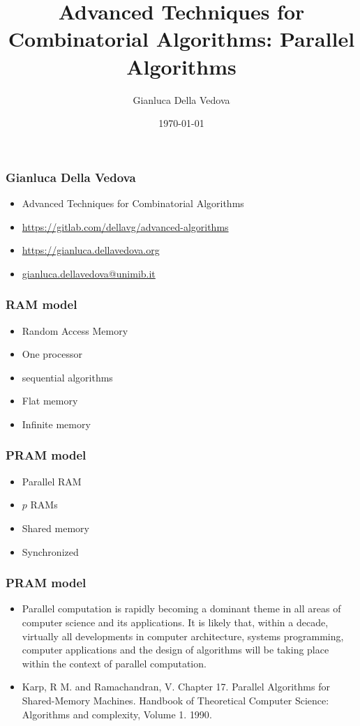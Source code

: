 \documentclass[14pt,aspectratio=169]{beamer}
\author{Gianluca Della Vedova}
\title[Advanced Algorithms]{Advanced Techniques for Combinatorial Algorithms:
Parallel Algorithms}
\institute[]{Univ. Milano--Bicocca\\
  \texttt{https://gianluca.dellavedova.org}}
\date[]{{\tiny \today\hspace{1em} \vcsShortHash}}
\begin{document}
\begin{frame}
  \titlepage
\end{frame}


\begin{frame}\frametitle{Gianluca Della Vedova}
  \begin{itemize}
  \item
                Advanced Techniques for Combinatorial Algorithms
\item
{\small\url{https://gitlab.com/dellavg/advanced-algorithms}}
  \item
{\small\url{https://gianluca.dellavedova.org}}
  \item
{\small\url{gianluca.dellavedova@unimib.it}}
  \end{itemize}
\end{frame}



\begin{frame}\frametitle{RAM model}
  \begin{itemize}
  \item
    Random Access Memory
  \item
    One processor
  \item
    sequential algorithms
  \item
    Flat memory
  \item
    Infinite memory
  \end{itemize}
\end{frame}

\begin{frame}\frametitle{PRAM model}
  \begin{itemize}
  \item
    \alert{Parallel} RAM
  \item
    $p$ RAMs
  \item
    Shared memory
  \item
    Synchronized
  \end{itemize}
\end{frame}

\begin{frame}\frametitle{PRAM model}
  \begin{itemize}
  \item
Parallel computation is \alert{rapidly} becoming a \alert{dominant} theme in all areas of
computer science and its applications.
It is likely that, \alert{within a decade}, virtually all developments in computer
architecture, systems programming, computer applications and the design of
algorithms will be taking place within the context of parallel computation.
\item
\small  Karp, R M. and Ramachandran, V. Chapter 17. Parallel Algorithms for
  Shared-Memory Machines. Handbook of Theoretical Computer Science: Algorithms and complexity, Volume 1.
 \alert{1990}.
\end{itemize}
\end{frame}
\end{document}
